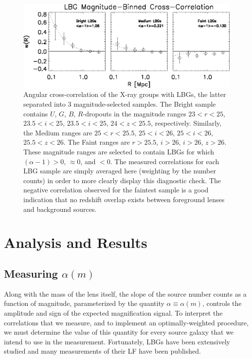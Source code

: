 \begin{figure}
\begin{center}
\includegraphics[scale=1.2]{plots_ch2/magbinnedLBGs_multiNFWfit.eps}
\caption[Magnitude-Binned Cross-Correlation]{Angular cross-correlation of the X-ray groups with \ac{LBG}s, the latter separated into 3 magnitude-selected samples.  The Bright sample contains $U$, $G$, $B$, $R$-dropouts in the magnitude ranges $23<r<25$, $23.5<i<25$,  $23.5<i<25$,  $24<z<25.5$, respectively. Similarly, the Medium ranges are $25<r<25.5$, $25<i<26$,  $25<i<26$,  $25.5<z<26$.  The Faint ranges are $r>25.5$, $i>26$,  $i>26$,  $z>26$. These magnitude ranges are selected to contain \ac{LBG}s for which $(\alpha-1)>0$, $\approx 0$, and $<0$.  The measured correlations for each \ac{LBG} sample are simply averaged here (weighting by the number counts) in order to more clearly display this diagnostic check.  The negative correlation observed for the faintest sample is a good indication that no redshift overlap exists between foreground lenses and background sources.}
\label{MagBinned}
\end{center}
\end{figure}

\section{Analysis and Results}
\label{results}
\subsection{Measuring $\alpha(m)$}
Along with the mass of the lens itself, the slope of the source number counts as a function of magnitude, parameterized by the quantity $\alpha \equiv \alpha(m)$, controls the amplitude and sign of the expected magnification signal.  To interpret the correlations that we measure, and to implement an optimally-weighted procedure, we must determine the value of this quantity for every source galaxy that we intend to use in the measurement.  Fortunately, \ac{LBG}s have been extensively studied and many measurements of their \ac{LF} have been published.  

